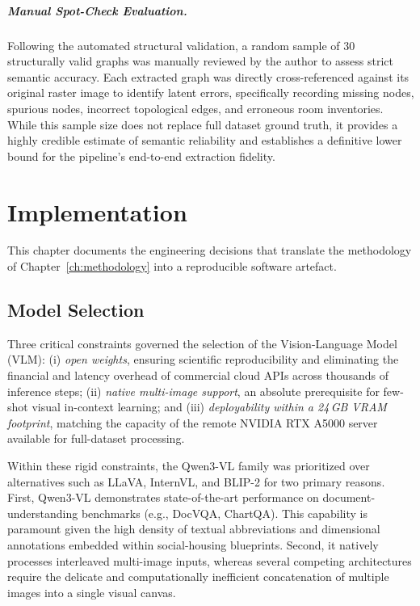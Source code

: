 \documentclass[12pt,a4paper,openright]{report}
\begin{document}
\paragraph{Manual Spot-Check Evaluation.} Following the automated structural validation, a random sample of 30 structurally valid graphs was manually reviewed by the author to assess strict semantic accuracy. Each extracted graph was directly cross-referenced against its original raster image to identify latent errors, specifically recording missing nodes, spurious nodes, incorrect topological edges, and erroneous room inventories. While this sample size does not replace full dataset ground truth, it provides a highly credible estimate of semantic reliability and establishes a definitive lower bound for the pipeline's end-to-end extraction fidelity.



\chapter{Implementation}
\label{ch:implementation}

This chapter documents the engineering decisions that translate the methodology of Chapter~\ref{ch:methodology} into a reproducible software artefact.

\section{Model Selection}
\label{sec:model_selection}

Three critical constraints governed the selection of the Vision-Language Model (VLM): (i) \emph{open weights}, ensuring scientific reproducibility and eliminating the financial and latency overhead of commercial cloud APIs across thousands of inference steps; (ii) \emph{native multi-image support}, an absolute prerequisite for few-shot visual in-context learning; and (iii) \emph{deployability within a 24\,GB VRAM footprint}, matching the capacity of the remote NVIDIA RTX A5000 server available for full-dataset processing.

Within these rigid constraints, the Qwen3-VL family was prioritized over alternatives such as LLaVA, InternVL, and BLIP-2 for two primary reasons. First, Qwen3-VL demonstrates state-of-the-art performance on document-understanding benchmarks (e.g., DocVQA, ChartQA). This capability is paramount given the high density of textual abbreviations and dimensional annotations embedded within social-housing blueprints. Second, it natively processes interleaved multi-image inputs, whereas several competing architectures require the delicate and computationally inefficient concatenation of multiple images into a single visual canvas.
\end{document}
